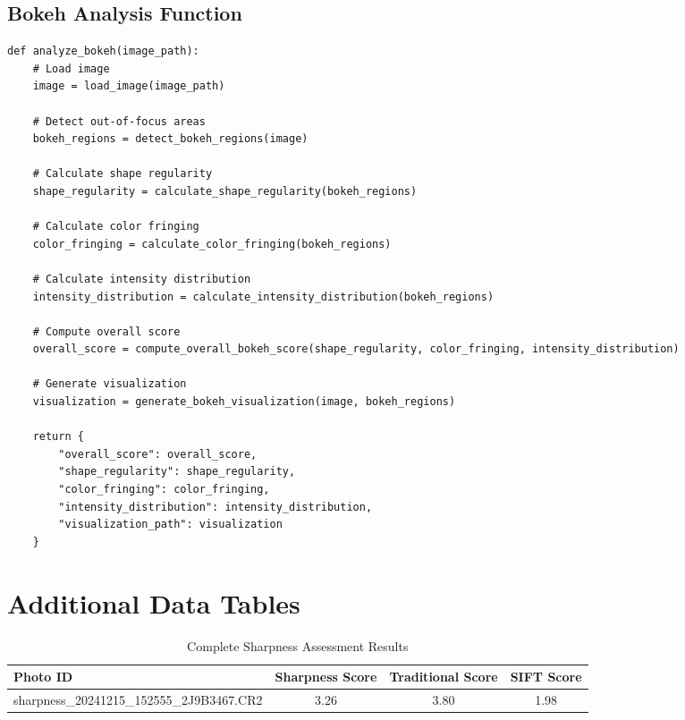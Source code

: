 \subsection{Bokeh Analysis Function}
\label{lst:bokeh_code}
\begin{lstlisting}[style=jsonStyle, caption={Bokeh Analysis Function}, label={lst:bokeh_code}]
def analyze_bokeh(image_path):
    # Load image
    image = load_image(image_path)
    
    # Detect out-of-focus areas
    bokeh_regions = detect_bokeh_regions(image)
    
    # Calculate shape regularity
    shape_regularity = calculate_shape_regularity(bokeh_regions)
    
    # Calculate color fringing
    color_fringing = calculate_color_fringing(bokeh_regions)
    
    # Calculate intensity distribution
    intensity_distribution = calculate_intensity_distribution(bokeh_regions)
    
    # Compute overall score
    overall_score = compute_overall_bokeh_score(shape_regularity, color_fringing, intensity_distribution)
    
    # Generate visualization
    visualization = generate_bokeh_visualization(image, bokeh_regions)
    
    return {
        "overall_score": overall_score,
        "shape_regularity": shape_regularity,
        "color_fringing": color_fringing,
        "intensity_distribution": intensity_distribution,
        "visualization_path": visualization
    }
\end{lstlisting}


\section{Additional Data Tables}
\label{app:additional_tables}

\begin{table}[H]
    \centering
    \caption{Complete Sharpness Assessment Results}
    \label{tab:complete_sharpness}
    \begin{tabular}{|l|c|c|c|}
        \hline
        \textbf{Photo ID} & \textbf{Sharpness Score} & \textbf{Traditional Score} & \textbf{SIFT Score} \\ \hline
        sharpness\_20241215\_152555\_2J9B3467.CR2 & 3.26 & 3.80 & 1.98 \\ \hline
    \end{tabular}
\end{table}

